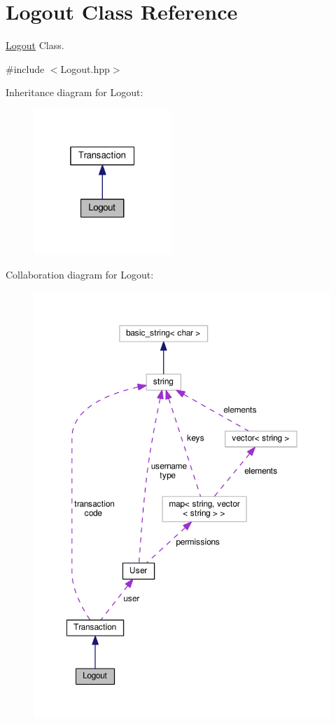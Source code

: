 \hypertarget{class_logout}{\section{Logout Class Reference}
\label{class_logout}
}


\hyperlink{class_logout}{Logout} Class.  




{\ttfamily \#include $<$Logout.\-hpp$>$}



Inheritance diagram for Logout\-:
\nopagebreak
\begin{figure}[H]
\begin{center}
\leavevmode
\includegraphics[width=148pt]{class_logout__inherit__graph}
\end{center}
\end{figure}


Collaboration diagram for Logout\-:
\nopagebreak
\begin{figure}[H]
\begin{center}
\leavevmode
\includegraphics[width=350pt]{class_logout__coll__graph}
\end{center}
\end{figure}
